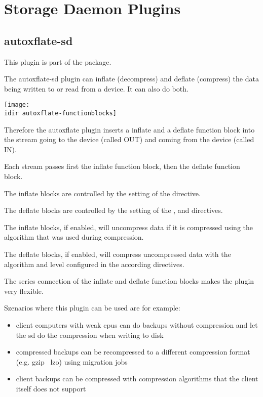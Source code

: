 
\section{Storage Daemon Plugins}
\label{sdPlugins}

\subsection{autoxflate-sd}
\label{plugin-autoxflate-sd}


This plugin is part of the  package.

The autoxflate-sd plugin can inflate (decompress) and deflate (compress)
the data being written to or read from a device. It can also do both.

\begin{center}
\texttt{[image: \\idir autoxflate-functionblocks]}
\end{center}

Therefore the autoxflate plugin inserts a inflate and a deflate function block
into the stream going to the device (called OUT) and coming from the device (called IN).

Each stream passes first the inflate function block, then the deflate function block.

The inflate blocks are controlled by the setting of the  directive.

The deflate blocks are controlled by the setting of the ,
 and  directives.

The inflate blocks, if enabled, will uncompress data if it is compressed using the
algorithm that was used during compression.

The deflate blocks, if enabled, will compress uncompressed data with the algorithm and level configured in the according directives.

The series connection of the inflate and deflate function blocks makes the plugin very flexible.

Szenarios where this plugin can be used are for example:
\begin{itemize}
   \item client computers with weak cpus can do backups without compression and let the sd do the compression when writing to disk
    \item compressed backups can be recompressed to a different compression format (e.g. gzip \textrightarrow\ lzo) using migration jobs
    \item client backups can be compressed with compression algorithms that the client itself does not support
\end{itemize}

